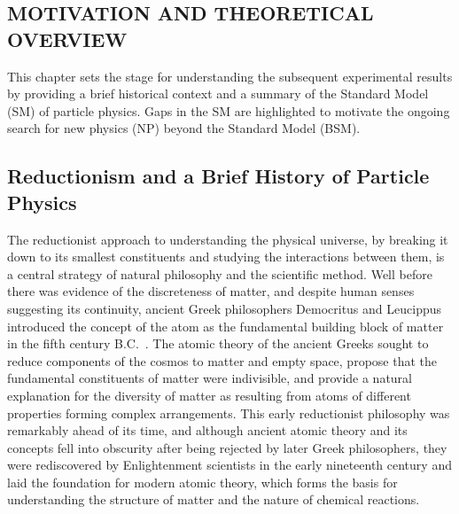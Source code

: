 \begin{refsection}

\chapter{MOTIVATION AND THEORETICAL OVERVIEW}
\label{Motivation_and_Theoretical_Overview}

\begin{cabstract}
This chapter sets the stage for understanding the subsequent experimental results by providing a brief historical context and a summary of the Standard Model (SM) of particle physics.
Gaps in the SM are highlighted to motivate the ongoing search for new physics (NP) beyond the Standard Model (BSM). 
\end{cabstract}

\section{Reductionism and a Brief History of Particle Physics}
The reductionist approach to understanding the physical universe, by breaking it down to its smallest constituents and studying the interactions between them, is a central strategy of natural philosophy and the scientific method.
Well before there was evidence of the discreteness of matter, and despite human senses suggesting its continuity, ancient Greek philosophers Democritus and Leucippus introduced the concept of the atom as the fundamental building block of matter in the fifth century B.C.~\cite{sep-atomism-ancient}.
The atomic theory of the ancient Greeks sought to reduce components of the cosmos to matter and empty space, propose that the fundamental constituents of matter were indivisible, and provide a natural explanation for the diversity of matter as resulting from atoms of different properties forming complex arrangements.
This early reductionist philosophy was remarkably ahead of its time, and although ancient atomic theory and its concepts fell into obscurity after being rejected by later Greek philosophers, they were rediscovered by Enlightenment scientists in the early nineteenth century and laid the foundation for modern atomic theory, which forms the basis for understanding the structure of matter and the nature of chemical reactions.


\end{refsection}
